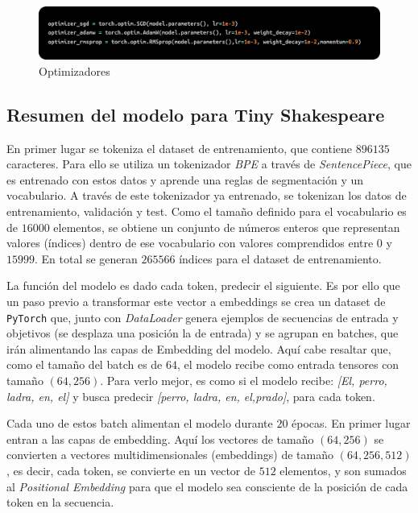 \documentclass[11pt]{book}
\begin{document}
\begin{figure}[h]
    \centering
    \includegraphics[width=0.5\linewidth]{img/optimizers.png}
    \caption{Optimizadores \parencite{stackoverflow_sgd_optimizer}}
    \label{fig:placeholder22}
\end{figure}


\subsection{Resumen del modelo para Tiny Shakespeare}

En primer lugar se tokeniza el dataset de entrenamiento, que contiene $896135$ caracteres. Para ello se utiliza un tokenizador \textit{BPE} a través de \textit{SentencePiece}, que es entrenado con estos datos y aprende una reglas de segmentación y un vocabulario. A través de este tokenizador ya entrenado, se tokenizan los datos de entrenamiento, validación y test. Como el tamaño definido para el vocabulario es de $16000$ elementos, se obtiene un conjunto de números enteros que representan valores (índices) dentro de ese vocabulario con valores comprendidos entre $0$ y $15999$. En total se generan $265566$ índices para el dataset de entrenamiento. 

La función del modelo es dado cada token, predecir el siguiente. Es por ello que un paso previo a transformar este vector a embeddings se crea un dataset de \texttt{PyTorch} que, junto con \textit{DataLoader} genera ejemplos de secuencias de entrada y objetivos (se desplaza una posición la de entrada) y se agrupan en batches, que irán alimentando las capas de Embedding del modelo. Aquí cabe resaltar que, como el tamaño del batch es de $64$, el modelo recibe como entrada tensores con tamaño $(64,256)$. Para verlo mejor, es como si el modelo recibe: \textit{[El, perro, ladra, en, el]} y busca predecir \textit{[perro, ladra, en, el,prado]}, para cada token.


Cada uno de estos batch alimentan el modelo durante $20$ épocas. En primer lugar entran a las capas de embedding. Aquí los vectores de tamaño $(64,256)$ se convierten a vectores multidimensionales (embeddings) de tamaño $(64,256, 512)$, es decir, cada token, se convierte en un vector de $512$ elementos, y son sumados al \textit{Positional Embedding} para que el modelo sea consciente de la posición de cada token en la secuencia. 
\end{document}
